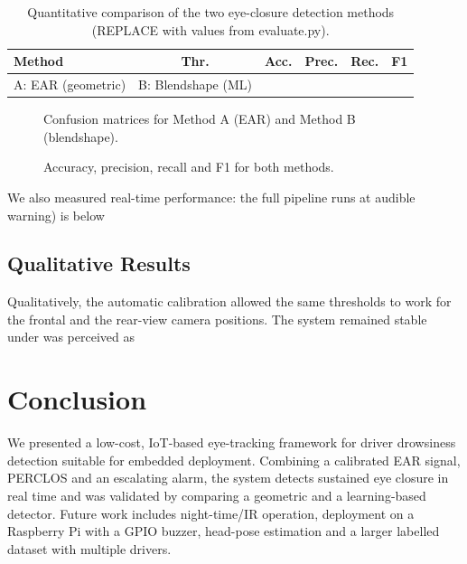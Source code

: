 \documentclass[conference]{IEEEtran}
\begin{document}
%
\begin{table}[t]
\centering
\caption{Quantitative comparison of the two eye-closure detection methods
(REPLACE with values from evaluate.py).}
\label{tab:results}
\begin{tabular}{lccccc}
\toprule
Method & Thr. & Acc. & Prec. & Rec. & F1 \\
\midrule
A: EAR (geometric) & %
B: Blendshape (ML) & %
\bottomrule
\end{tabular}
\end{table}

\begin{figure}[t]
\centering
\caption{Confusion matrices for Method A (EAR) and Method B (blendshape).}
\label{fig:cm}
\end{figure}

\begin{figure}[t]
\centering
\caption{Accuracy, precision, recall and F1 for both methods.}
\label{fig:bars}
\end{figure}

We also measured real-time performance: the full pipeline runs at
audible warning) is below %

\subsection{Qualitative Results}
Qualitatively, the automatic calibration allowed the same thresholds to work
for the frontal and the rear-view camera positions. The system remained stable
under %
was perceived as %

\section{Conclusion}
We presented a low-cost, IoT-based eye-tracking framework for driver drowsiness
detection suitable for embedded deployment. Combining a calibrated EAR signal,
PERCLOS and an escalating alarm, the system detects sustained eye closure in
real time and was validated by comparing a geometric and a learning-based
detector. Future work includes night-time/IR operation, deployment on a
Raspberry Pi with a GPIO buzzer, head-pose estimation and a larger labelled
dataset with multiple drivers.
\end{document}
